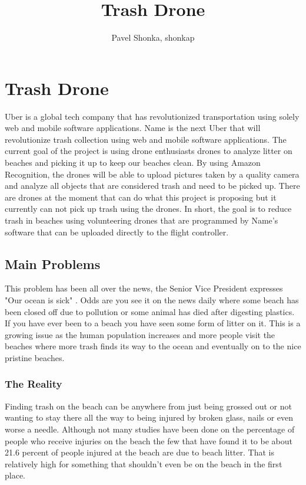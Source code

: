 \documentclass[12pt]{article}
\title{Trash Drone}
\author{Pavel Shonka, shonkap}
\begin{document}
\maketitle
\tableofcontents



\section{Trash Drone}
Uber is a global tech company that has revolutionized transportation using solely web and mobile software applications. Name is the next Uber that will revolutionize trash collection using web and mobile software applications. The current goal of the project is using drone enthusiasts drones to analyze litter on beaches and picking it up to keep our beaches clean. By using Amazon Recognition, the drones will be able to upload pictures taken by a quality camera and analyze all objects that are considered trash and need to be picked up. There are drones at the moment that can do what this project is proposing but it currently can not pick up trash using the drones. In short, the goal is to reduce trash in beaches using volunteering drones that are programmed by Name's software that can be uploaded directly to the flight controller.
\newline
\newline

\subsection{Main Problems}
This problem has been all over the news, the Senior Vice President expresses "Our ocean is sick" \cite{pfleeger2010software}. Odds are you see it on the news daily where some beach has been closed off due to pollution or some animal has died after digesting plastics. If you have ever been to a beach you have seen some form of litter on it. This is a growing issue as the human population increases and more people visit the beaches where more trash finds its way to the ocean and eventually on to the nice pristine beaches.
\newline
\newline

\subsubsection{The Reality}
Finding trash on the beach can be anywhere from just being grossed out or not wanting to stay there all the way to being injured by broken glass, nails or even worse a needle. Although not many studies have been done on the percentage of people who receive injuries on the beach the few that have found it to be about 21.6 percent of people injured at the beach are due to beach litter. That is relatively high for something that shouldn't even be on the beach in the first place.
\newline
\newline
\end{document}
